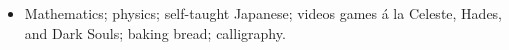 \begin{itemize}[nosep]
    \item
        Mathematics;
        physics;
        self-taught Japanese;
        videos games \'a la Celeste, Hades, and Dark Souls;
        baking bread;
        calligraphy.
\end{itemize}
